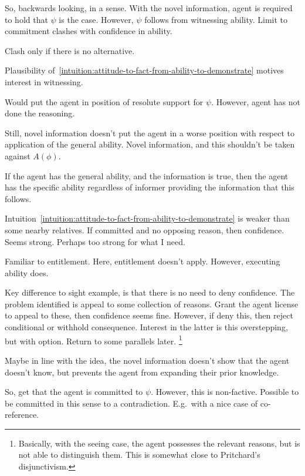\documentclass[10pt]{article}
\newcommand{\hozlinedash}[0]{%
  \noindent\hdashrule[0.5ex][c]{\textwidth}{.1pt}{2.5pt}
}
\begin{document}
\begin{note}
  So, backwards looking, in a sense.
  With the novel information, agent is required to hold that \(\psi\) is the case.
  However, \(\psi\) follows from witnessing ability.
  Limit to commitment clashes with confidence in ability.

  Clash only if there is no alternative.

  Plausibility of~\ref{intuition:attitude-to-fact-from-ability-to-demonstrate} motives interest in witnessing.

  Would put the agent in position of resolute support for \(\psi\).
  However, agent has not done the reasoning.

  Still, novel information doesn't put the agent in a worse position with respect to application of the general ability.
  Novel information, and this shouldn't be taken against \(A(\phi)\).

  If the agent has the general ability, and the information is true, then the agent has the specific ability regardless of informer providing the information that this follows.

  \hozlinedash

  Intuition~\ref{intuition:attitude-to-fact-from-ability-to-demonstrate} is weaker than some nearby relatives.
  If committed and no opposing reason, then confidence.
  Seems strong.
  Perhaps too strong for what I need.

  Familiar to entitlement.
  Here, entitlement doesn't apply.
  However, executing ability does.

  Key difference to sight example, is that there is no need to deny confidence.
  The problem identified is appeal to some collection of reasons.
  Grant the agent license to appeal to these, then confidence seems fine.
  However, if deny this, then reject conditional or withhold consequence.
  {
    \color{red}
    Interest in the latter is this overstepping, but with option.
    Return to some parallels later.\nolinebreak
    \footnote{
      Basically, with the seeing case, the agent possesses the relevant reasons, but is not able to distinguish them.
      This is somewhat close to Pritchard's disjunctivism.
    }
  }

  Maybe in line with the \citeauthor{Harman:1973ww} idea, the novel information doesn't show that the agent doesn't know, but prevents the agent from expanding their prior knowledge.
\end{note}

\begin{note}
  So, get that the agent is committed to \(\psi\).
  However, this is non-factive.
  Possible to be committed in this sense to a contradiction.
  E.g.\ with a nice case of co-reference.
\end{note}
\end{document}
